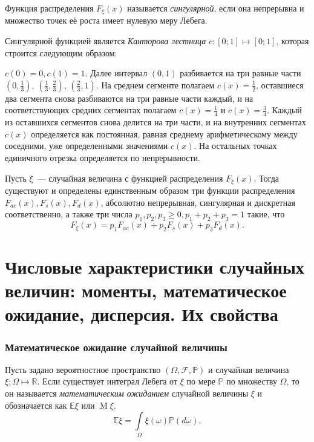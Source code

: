 \begin{defn}
    Функция распределения $F_\xi(x)$ называется {\it сингулярной}, если она непрерывна и множество точек её роста имеет нулевую меру Лебега.
\end{defn}
\begin{exmp}
    Сингулярной функцией является \textit{Канторова лестница} $c \colon [0;1] \mapsto [0;1]$, которая строится следующим образом:
    
    $c(0) = 0, c(1) = 1$. Далее интервал $(0, 1)$ разбивается на три равные части $(0, \frac{1}{3})$, $(\frac{1}{3}, \frac{2}{3})$, $(\frac{2}{3}, 1)$. На среднем сегменте полагаем $c(x) = \frac{1}{2}$, оставшиеся два сегмента снова разбиваются на три равные части каждый, и на соответствующих средних сегментах полагаем $c(x) = \frac{1}{4}$ и $c(x) = \frac{3}{4}$. Каждый из оставшихся сегментов снова делится на три части, и на внутренних сегментах $c(x)$ определяется как постоянная, равная среднему арифметическому между соседними, уже определенными значениями $c(x)$. На остальных точках единичного отрезка определяется по непрерывности. 
\end{exmp}

\begin{namedthm}
    Пусть $\xi$~--- случайная величина с функцией распределения $F_\xi(x).$ Тогда существуют и определены единственным образом три функции распределения $F_{ac}(x), F_s(x), F_d(x)$, абсолютно непрерывная, сингулярная и дискретная соответственно, а также три числа $p_1, p_2, p_3 \geqslant 0, p_1 + p_2 + p_3 = 1$ такие, что 
    \begin{equation*}
        F_{\xi}(x)=p_{1} F_{ac}(x)+p_{2} F_{s}(x)+p_{3} F_{d}(x).
    \end{equation*}
\end{namedthm}

\section{Числовые характеристики случайных величин: моменты, математическое ожидание, дисперсия. Их свойства}

\subsubsection{Математическое ожидание случайной величины}

\begin{defn}
    Пусть задано вероятностное пространство $(\Omega, \mathcal{F}, \mathbb{P})$ и случайная величина $\xi: \Omega \mapsto \mathbb{R}$. Если существует интеграл Лебега от $\xi$ по мере $\mathbb{P}$ по множеству $\Omega$, то он называется {\it математическим ожиданием} случайной величины $\xi$ и обозначается как $\mathbb{E}\xi$ или $\operatorname{M}\xi$.
    $$ \mathbb{E}\xi = \int\limits_{\Omega} \xi(\omega) \mathbb{P}(d\omega).$$
\end{defn}

